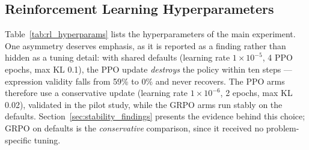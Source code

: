 \subsection{Reinforcement Learning Hyperparameters}
\label{sec:rl_hyperparams}

Table~\ref{tab:rl_hyperparams} lists the hyperparameters of the main experiment. One asymmetry deserves emphasis, as it is reported as a finding rather than hidden as a tuning detail: with shared defaults (learning rate $1\times10^{-5}$, 4 PPO epochs, max KL 0.1), the PPO update \emph{destroys} the policy within ten steps --- expression validity falls from 59\% to 0\% and never recovers. The PPO arms therefore use a conservative update (learning rate $1\times10^{-6}$, 2 epochs, max KL 0.02), validated in the pilot study, while the GRPO arms run stably on the defaults. Section~\ref{sec:stability_findings} presents the evidence behind this choice; GRPO on defaults is the \emph{conservative} comparison, since it received no problem-specific tuning.


